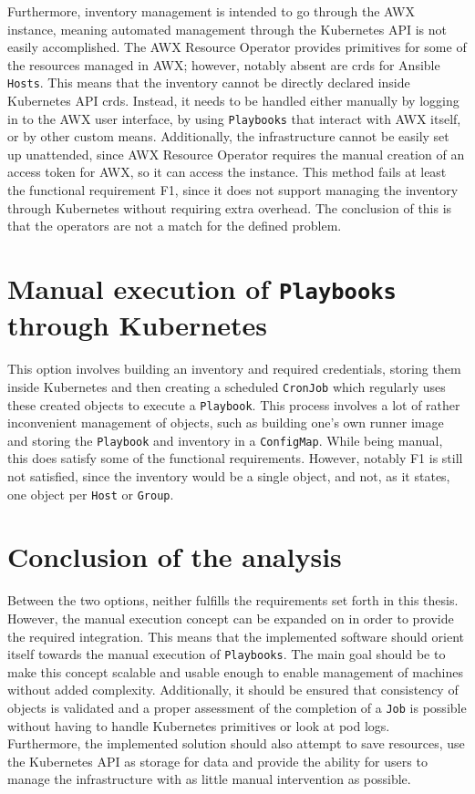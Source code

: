 Furthermore, inventory management is intended to go through the AWX instance, meaning automated management through the Kubernetes API is not easily accomplished.
The AWX Resource Operator provides primitives for some of the resources managed in AWX; however, notably absent are \glspl{crd} for Ansible \texttt{Hosts}.
This means that the inventory cannot be directly declared inside Kubernetes API \glspl{crd}.
Instead, it needs to be handled either manually by logging in to the AWX user interface, by using \texttt{Playbooks} that interact with AWX itself, or by other custom means.
Additionally, the infrastructure cannot be easily set up unattended, since AWX Resource Operator requires the manual creation of an access token for AWX, so it can access the instance.
This method fails at least the functional requirement F1, since it does not support managing the inventory through Kubernetes without requiring extra overhead.
The conclusion of this is that the operators are not a match for the defined problem.

\section{Manual execution of \texttt{Playbooks} through Kubernetes}
This option involves building an inventory and required credentials, storing them inside Kubernetes and then creating a scheduled \texttt{CronJob} which regularly uses these created objects to execute a \texttt{Playbook}.
This process involves a lot of rather inconvenient management of objects, such as building one's own runner image and storing the \texttt{Playbook} and inventory in a \texttt{ConfigMap}.
While being manual, this does satisfy some of the functional requirements.
However, notably F1 is still not satisfied, since the inventory would be a single object, and not, as it states, one object per \texttt{Host} or \texttt{Group}.

\section{Conclusion of the analysis}
Between the two options, neither fulfills the requirements set forth in this thesis.
However, the manual execution concept can be expanded on in order to provide the required integration.
This means that the implemented software should orient itself towards the manual execution of \texttt{Playbooks}.
The main goal should be to make this concept scalable and usable enough to enable management of machines without added complexity.
Additionally, it should be ensured that consistency of objects is validated and a proper assessment of the completion of a \texttt{Job} is possible without having to handle Kubernetes primitives or look at \gls{pod} logs.
Furthermore, the implemented solution should also attempt to save resources, use the Kubernetes API as storage for data and provide the ability for users to manage the infrastructure with as little manual intervention as possible.
